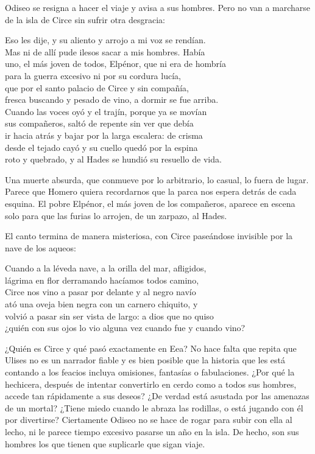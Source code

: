 Odiseo se resigna a hacer el viaje y avisa a sus hombres. Pero no van a marcharse de la isla de Circe sin sufrir otra desgracia:

\begin{versocita}
Eso les dije, y su aliento y arrojo a mi voz se rendían.\\
Mas ni de allí pude ilesos sacar a mis hombres. Había\\
uno, el más joven de todos, Elpénor, que ni era de hombría\\
para la guerra excesivo ni por su cordura lucía,\\
que por el santo palacio de Circe y sin compañía,\\
fresca buscando y pesado de vino, a dormir se fue arriba.\\
Cuando las voces oyó y el trajín, porque ya se movían\\
sus compañeros, saltó de repente sin ver que debía\\
ir hacia atrás y bajar por la larga escalera: de crisma\\
desde el tejado cayó y su cuello quedó por la espina\\
roto y quebrado, y al Hades se hundió su resuello de vida.
\end{versocita}

Una muerte absurda, que conmueve por lo arbitrario, lo casual, lo fuera de lugar. Parece que Homero quiera recordarnos que la parca nos espera detrás de cada esquina. El pobre Elpénor, el más joven de los compañeros, aparece en escena solo para que las furias lo arrojen, de un zarpazo, al Hades.

El canto termina de manera misteriosa, con Circe paseándose invisible por la nave de los aqueos:

\begin{versocita}
Cuando a la léveda nave, a la orilla del mar, afligidos,\\
lágrima en flor derramando hacíamos todos camino,\\
Circe nos vino a pasar por delante y al negro navío\\
ató una oveja bien negra con un carnero chiquito, y\\
volvió a pasar sin ser vista de largo: a dios que no quiso\\
¿quién con sus ojos lo vio alguna vez cuando fue y cuando vino?
\end{versocita}

¿Quién es Circe y qué pasó exactamente en Eea? No hace falta que repita que Ulises no es un narrador fiable y es bien posible que la historia que les está contando a los feacios incluya omisiones, fantasías o fabulaciones. ¿Por qué la hechicera, después de intentar convertirlo en cerdo como a todos sus hombres, accede tan rápidamente a sus deseos? ¿De verdad está asustada por las amenazas de un mortal? ¿Tiene miedo cuando le abraza las rodillas, o está jugando con él por divertirse? Ciertamente Odiseo no se hace de rogar para subir con ella al lecho, ni le parece tiempo excesivo pasarse un año en la isla. De hecho, son sus hombres los que tienen que suplicarle que sigan viaje.

